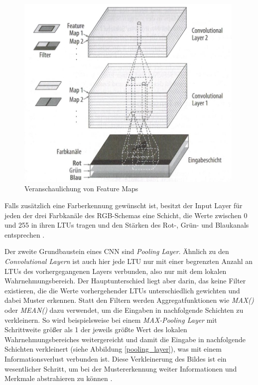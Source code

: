 \begin{figure}[H]
	\begin{center}
		\includegraphics[width=11cm]{Bilder/feature_maps.jpeg} 
		\caption[Veranschaulichung von Feature Maps]{Veranschaulichung von Feature Maps \cite{AurelienGeron.2018}}
		\label{feature_maps}
	\end{center}
\end{figure}

Falls zusätzlich eine Farberkennung gewünscht ist, besitzt der Input Layer für jeden der drei Farbkanäle des RGB-Schemas eine Schicht, die Werte zwischen 0 und 255 in ihren LTUs tragen und den Stärken des Rot-, Grün- und Blaukanals entsprechen \cite{AurelienGeron.2018}.

Der zweite Grundbaustein eines CNN sind \textit{Pooling Layer}. Ähnlich zu den \textit{Convolutional Layern} ist auch hier jede LTU nur mit einer begrenzten Anzahl an LTUs des vorhergegangenen Layers verbunden, also nur mit dem lokalen Wahrnehmungsbereich. Der Hauptunterschied liegt aber darin, das keine Filter existieren, die die Werte vorhergehender LTUs unterschiedlich gewichten und dabei Muster erkennen. Statt den Filtern werden Aggregatfunktionen wie \textit{MAX()} oder \textit{MEAN()} dazu verwendet, um die Eingaben in nachfolgende Schichten zu verkleinern. So wird beispielsweise bei einem \textit{MAX-Pooling Layer} mit Schrittweite größer als 1 der jeweils größte Wert des lokalen Wahrnehmungsbereiches weitergereicht und damit die  Eingabe in nachfolgende Schichten verkleinert (siehe Abbildung \ref{pooling_layer}), was mit einem Informationsverlust verbunden ist. Diese Verkleinerung des Bildes ist ein wesentlicher Schritt, um bei der Mustererkennung weiter Informationen und Merkmale abstrahieren zu können \cite{AurelienGeron.2018}.

